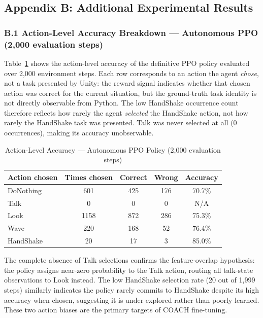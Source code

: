 \documentclass[../report.tex]{subfiles}
\begin{document}
    \subsection*{Appendix B: Additional Experimental Results}

    \subsubsection*{B.1 Action-Level Accuracy Breakdown --- Autonomous PPO (2,000 evaluation steps)}

    Table~\ref{tab:confusion} shows the action-level accuracy of the definitive PPO policy evaluated over 2,000 environment steps. Each row corresponds to an action the agent \emph{chose}, not a task presented by Unity: the reward signal indicates whether that chosen action was correct for the current situation, but the ground-truth task identity is not directly observable from Python. The low HandShake occurrence count therefore reflects how rarely the agent \emph{selected} the HandShake action, not how rarely the HandShake task was presented. Talk was never selected at all (0 occurrences), making its accuracy unobservable.

    \begin{table}[t]
        \centering
        \caption{Action-Level Accuracy --- Autonomous PPO Policy (2,000 evaluation steps)}
        \label{tab:confusion}
        \begin{tabular}{lcccc}
            \toprule
            \textbf{Action chosen} & \textbf{Times chosen} & \textbf{Correct} & \textbf{Wrong} & \textbf{Accuracy} \\
            \midrule
            DoNothing  & 601  & 425 & 176 & 70.7\% \\
            Talk       & 0    & 0   & 0   & N/A    \\
            Look       & 1158 & 872 & 286 & 75.3\% \\
            Wave       & 220  & 168 & 52  & 76.4\% \\
            HandShake  & 20   & 17  & 3   & 85.0\% \\
            \bottomrule
        \end{tabular}
    \end{table}

    The complete absence of Talk selections confirms the feature-overlap hypothesis: the policy assigns near-zero probability to the Talk action, routing all talk-state observations to Look instead. The low HandShake selection rate (20 out of 1,999 steps) similarly indicates the policy rarely commits to HandShake despite its high accuracy when chosen, suggesting it is under-explored rather than poorly learned. These two action biases are the primary targets of COACH fine-tuning.
\end{document}

